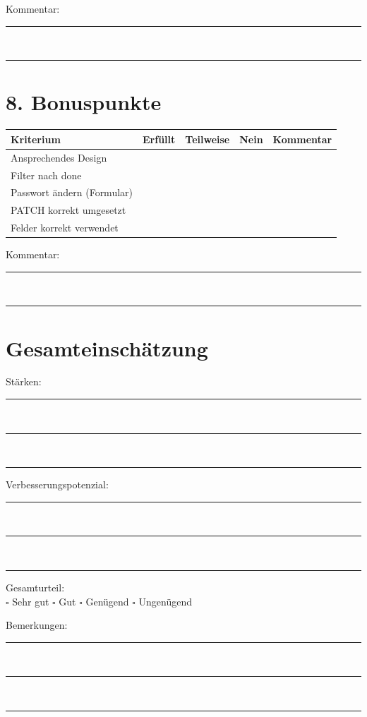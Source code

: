 \documentclass[a4paper,12pt]{article}
\begin{document}
Kommentar:\\
\rule{\textwidth}{0.4pt}\\
\rule{\textwidth}{0.4pt}

\section*{8. Bonuspunkte}

\begin{longtable}{|p{7cm}|c|c|c|p{4cm}|}
\hline
Kriterium & Erfüllt & Teilweise & Nein & Kommentar \\
\hline
Ansprechendes Design & & & & \\
\hline
Filter nach done & & & & \\
\hline
Passwort ändern (Formular) & & & & \\
\hline
PATCH korrekt umgesetzt & & & & \\
\hline
Felder korrekt verwendet & & & & \\
\hline
\end{longtable}

Kommentar:\\
\rule{\textwidth}{0.4pt}\\
\rule{\textwidth}{0.4pt}

\section*{Gesamteinschätzung}

Stärken:\\
\rule{\textwidth}{0.4pt}\\
\rule{\textwidth}{0.4pt}\\
\rule{\textwidth}{0.4pt}

\vspace{0.3cm}

Verbesserungspotenzial:\\
\rule{\textwidth}{0.4pt}\\
\rule{\textwidth}{0.4pt}\\
\rule{\textwidth}{0.4pt}

\vspace{0.5cm}

Gesamturteil: \\
$\square$ Sehr gut \quad
$\square$ Gut \quad
$\square$ Genügend \quad
$\square$ Ungenügend

\vspace{1cm}

Bemerkungen:\\
\rule{\textwidth}{0.4pt}\\
\rule{\textwidth}{0.4pt}\\
\rule{\textwidth}{0.4pt}
\end{document}
